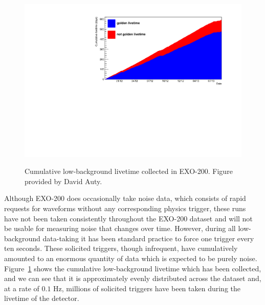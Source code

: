 \begin{figure}
\begin{center}
\includegraphics[keepaspectratio=true,width=\textwidth]{scripts/livetime.pdf}
\end{center}
\renewcommand{\baselinestretch}{1}
\small\normalsize
\begin{quote}
\caption{Cumulative low-background livetime collected in EXO-200.  Figure provided by David Auty.}
\label{fig:CumulativeLivetime}
\end{quote}
\end{figure}
\renewcommand{\baselinestretch}{2}
\small\normalsize

Although EXO-200 does occasionally take noise data, which consists of rapid requests for waveforms without any corresponding physics trigger, these runs have not been taken consistently throughout the EXO-200 dataset and will not be usable for measuring noise that changes over time.  However, during all low-background data-taking it has been standard practice to force one trigger every ten seconds.  These solicited triggers, though infrequent, have cumulatively amounted to an enormous quantity of data which is expected to be purely noise.  Figure~\ref{fig:CumulativeLivetime} shows the cumulative low-background livetime which has been collected, and we can see that it is approximately evenly distributed across the dataset and, at a rate of $0.1$ Hz, millions of solicited triggers have been taken during the livetime of the detector.


